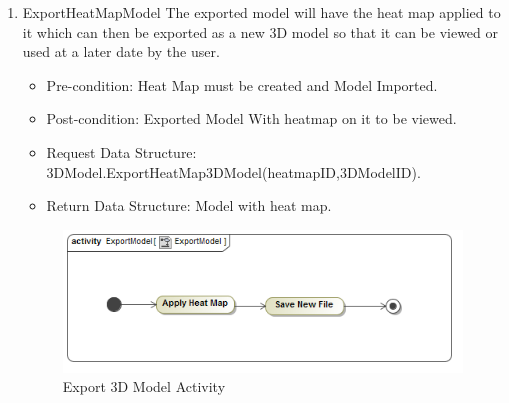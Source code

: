 \begin{enumerate}
		\item{ExportHeatMapModel}
		The exported model will have the heat map applied to it which can then be exported as a new 3D model so that it can be viewed or used at a later date by the user. 
		\begin{itemize}
			\item Pre-condition: Heat Map must be created and Model Imported.
			\item Post-condition: Exported Model With heatmap on it to be viewed.
			\item Request Data Structure: 3DModel.ExportHeatMap3DModel(heatmapID,3DModelID).
			\item Return Data Structure: Model with heat map.
		\end{itemize}
		
		\begin{figure}[!ht]
			\centering
			\includegraphics[scale=0.5]{Diagrams/Activity_Diagram__ExportModel__ExportModel.png}
			\caption{Export 3D Model Activity}
		\end{figure}
	\end{enumerate}

